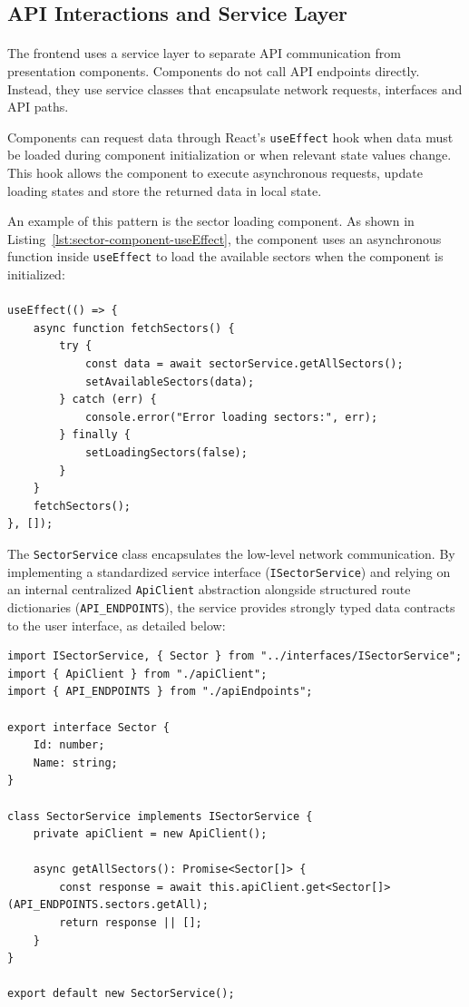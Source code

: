 \subsection{API Interactions and Service Layer}
\paragraph{}The frontend uses a service layer to separate API communication from presentation components. Components do not call API endpoints directly. Instead, they use service classes that encapsulate network requests, interfaces and API paths.

Components can request data through React's \texttt{useEffect} hook when data must be loaded during component initialization or when relevant state values change. This hook allows the component to execute asynchronous requests, update loading states and store the returned data in local state.

An example of this pattern is the sector loading component. As shown in Listing~\ref{lst:sector-component-useEffect}, the component uses an asynchronous function inside \texttt{useEffect} to load the available sectors when the component is initialized:
\paragraph{}
\begin{lstlisting}[caption={Component data fetching via useEffect}, label={lst:sector-component-useEffect}]
useEffect(() => {
    async function fetchSectors() {
        try {
            const data = await sectorService.getAllSectors();
            setAvailableSectors(data);
        } catch (err) {
            console.error("Error loading sectors:", err);
        } finally {
            setLoadingSectors(false);
        }
    }
    fetchSectors();
}, []);
\end{lstlisting}

The \texttt{SectorService} class encapsulates the low-level network communication. By implementing a standardized service interface (\texttt{ISectorService}) and relying on an internal centralized \texttt{ApiClient} abstraction alongside structured route dictionaries (\texttt{API\_ENDPOINTS}), the service provides strongly typed data contracts to the user interface, as detailed below:

\begin{lstlisting}[caption={Sector Service layer implementation}, label={lst:sector-service-implementation}]
import ISectorService, { Sector } from "../interfaces/ISectorService";
import { ApiClient } from "./apiClient";
import { API_ENDPOINTS } from "./apiEndpoints";

export interface Sector {
    Id: number;
    Name: string;
}

class SectorService implements ISectorService {
    private apiClient = new ApiClient();

    async getAllSectors(): Promise<Sector[]> {
        const response = await this.apiClient.get<Sector[]>(API_ENDPOINTS.sectors.getAll);
        return response || [];
    }
}

export default new SectorService();
\end{lstlisting}

